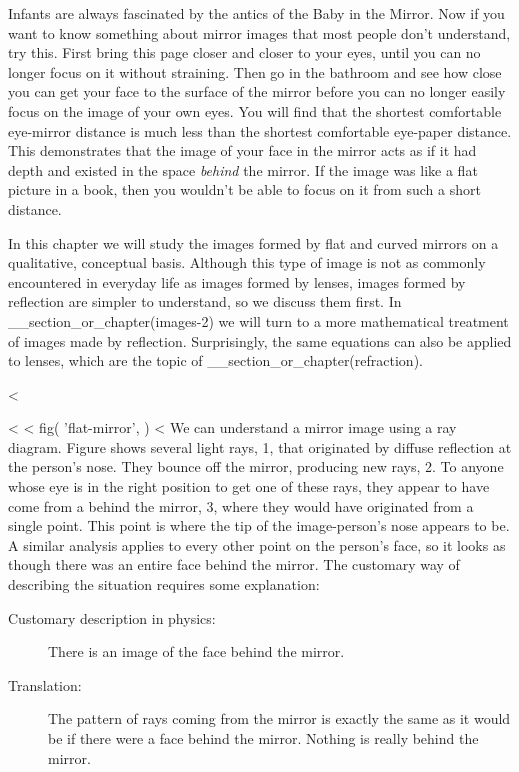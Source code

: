 Infants are always fascinated by the antics of the Baby in
the Mirror. Now if you want to know something about mirror
images that most people don't understand, try this. First
bring this page closer and closer to your eyes, until you
can no longer focus on it without straining. Then go in the
bathroom and see how close you can get your face to the
surface of the mirror before you can no longer easily focus
on the image of your own eyes. You will find that the
shortest comfortable eye-mirror distance is much less than
the shortest comfortable eye-paper distance. This demonstrates
that the image of your face in the mirror acts as if it had
depth and existed in the space \emph{behind} the mirror. If
the image was like a flat picture in a book, then you
wouldn't be able to focus on it from such a short distance.

In this chapter we will study the images formed by flat and
curved mirrors on a qualitative, conceptual basis. Although
this type of image is not as commonly encountered in
everyday life as images formed by lenses, images formed by
reflection are simpler to understand, so we discuss them
first. In __section_or_chapter(images-2) we will turn to a more mathematical
treatment of images made by reflection. Surprisingly, the
same equations can also be applied to lenses, which are
the topic of __section_or_chapter(refraction).

<%

<%
<%
  fig(
    'flat-mirror',
  )
<%
We can understand a mirror image using a ray diagram. Figure 
 shows several light rays, 1, that originated by
diffuse reflection at the person's nose. They bounce off the
mirror, producing new rays, 2. To anyone whose eye is in
the right position to get one of these rays, they appear to
have come from a behind the mirror, 3, where they would
have originated from a single point. This point is where the
tip of the image-person's nose appears to be. A similar
analysis applies to every other point on the person's face,
so it looks as though there was an entire face behind the
mirror. The customary way of describing the situation
requires some explanation:

\begin{description}

\item[Customary description in physics:] There is an image of the
face behind the mirror.

\item[Translation:] The pattern of rays coming from the mirror is
exactly the same as it would be if there were a face behind
the mirror. Nothing is really behind the mirror.

\end{description}

